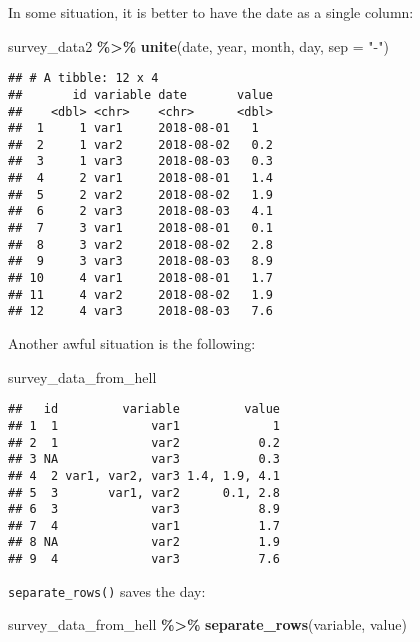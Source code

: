 \documentclass[
]{article}
\newenvironment{Shaded}{\begin{snugshade}}{\end{snugshade}}
\newcommand{\DataTypeTok}[1]{\textcolor[rgb]{0.13,0.29,0.53}{#1}}
\newcommand{\KeywordTok}[1]{\textcolor[rgb]{0.13,0.29,0.53}{\textbf{#1}}}
\newcommand{\NormalTok}[1]{#1}
\newcommand{\OperatorTok}[1]{\textcolor[rgb]{0.81,0.36,0.00}{\textbf{#1}}}
\newcommand{\StringTok}[1]{\textcolor[rgb]{0.31,0.60,0.02}{#1}}
\begin{document}
In some situation, it is better to have the date as a single column:

\begin{Shaded}
\begin{Highlighting}[]
\NormalTok{survey\_data2 }\OperatorTok{\%\textgreater{}\%}
\StringTok{    }\KeywordTok{unite}\NormalTok{(date, year, month, day, }\DataTypeTok{sep =} \StringTok{"{-}"}\NormalTok{)}
\end{Highlighting}
\end{Shaded}

\begin{verbatim}
## # A tibble: 12 x 4
##       id variable date       value
##    <dbl> <chr>    <chr>      <dbl>
##  1     1 var1     2018-08-01   1  
##  2     1 var2     2018-08-02   0.2
##  3     1 var3     2018-08-03   0.3
##  4     2 var1     2018-08-01   1.4
##  5     2 var2     2018-08-02   1.9
##  6     2 var3     2018-08-03   4.1
##  7     3 var1     2018-08-01   0.1
##  8     3 var2     2018-08-02   2.8
##  9     3 var3     2018-08-03   8.9
## 10     4 var1     2018-08-01   1.7
## 11     4 var2     2018-08-02   1.9
## 12     4 var3     2018-08-03   7.6
\end{verbatim}

Another awful situation is the following:

\begin{Shaded}
\begin{Highlighting}[]
\NormalTok{survey\_data\_from\_hell}
\end{Highlighting}
\end{Shaded}

\begin{verbatim}
##   id         variable         value
## 1  1             var1             1
## 2  1             var2           0.2
## 3 NA             var3           0.3
## 4  2 var1, var2, var3 1.4, 1.9, 4.1
## 5  3       var1, var2      0.1, 2.8
## 6  3             var3           8.9
## 7  4             var1           1.7
## 8 NA             var2           1.9
## 9  4             var3           7.6
\end{verbatim}

\texttt{separate\_rows()} saves the day:

\begin{Shaded}
\begin{Highlighting}[]
\NormalTok{survey\_data\_from\_hell }\OperatorTok{\%\textgreater{}\%}
\StringTok{    }\KeywordTok{separate\_rows}\NormalTok{(variable, value)}
\end{Highlighting}
\end{Shaded}
\end{document}
